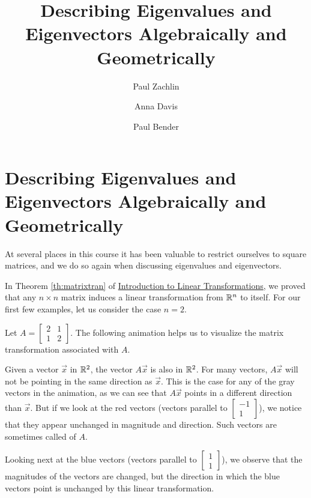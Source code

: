\documentclass{ximera}
\author{Paul Zachlin \and Anna Davis \and Paul Bender} \title{Describing Eigenvalues and Eigenvectors Algebraically and Geometrically} \license{CC-BY 4.0}
\begin{document}
\begin{abstract}

\end{abstract}
\maketitle
\section*{Describing Eigenvalues and Eigenvectors Algebraically and Geometrically}
At several places in this course it has been valuable to restrict ourselves to square matrices, and we do so again when discussing eigenvalues and eigenvectors.  

In Theorem \ref{th:matrixtran} 
of \href{https://ximera.osu.edu/oerlinalg/LinearAlgebra/LTR-0010/main}{Introduction to Linear Transformations}, we proved that any $n \times n$  matrix induces a linear transformation from $\mathbb{R}^n$ to itself.  For our first few examples, let us consider the case $n = 2$. 

\begin{exploration}\label{init:eignintro}
Let $A=\begin{bmatrix} 2& 1\\ 1&2
\end{bmatrix}$.  The following animation helps us to visualize the matrix transformation associated with $A$.

\begin{center}
  \end{center}

Given a vector $\vec{x}$ in $\mathbb{R}^2$, the vector $A\vec{x}$ is also in $\mathbb{R}^2$.  For many vectors, $A\vec{x}$ will not be pointing in the same direction as $\vec{x}$.  This is the case for any of the gray vectors in the animation, as we can see that $A\vec{x}$ points in a different direction than $\vec{x}$.  But if we look at the red vectors (vectors parallel to $\begin{bmatrix}-1\\1\end{bmatrix}$), we notice that they appear unchanged in magnitude and direction.  Such vectors are sometimes called  of $A$.

Looking next at the blue vectors (vectors parallel to $\begin{bmatrix}1\\1\end{bmatrix}$), we observe that the magnitudes of the vectors are changed, but the direction in which the blue vectors point is unchanged by this linear transformation.  
\end{exploration}
\end{document}
